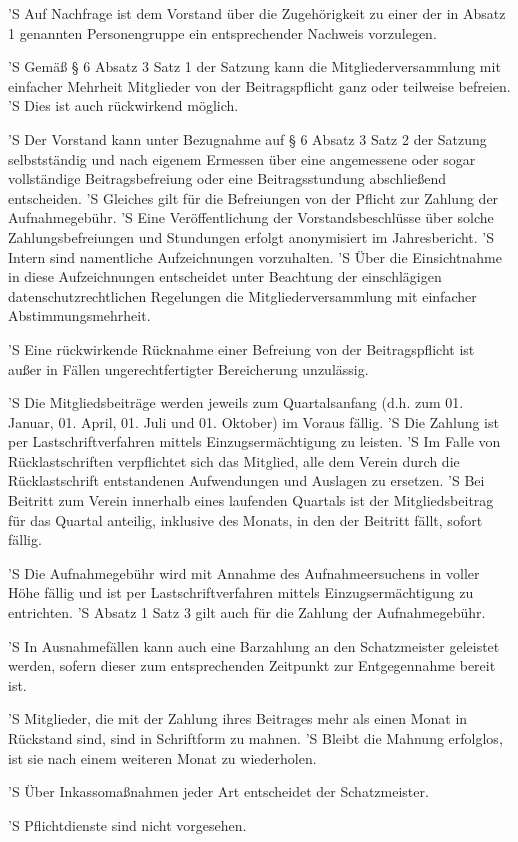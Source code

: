 \documentclass[a4paper,10pt]{scrreprt}
\begin{document}
\begin{contract}
'S Auf Nachfrage ist dem Vorstand über die Zugehörigkeit zu einer der in Absatz
1 genannten Personengruppe ein entsprechender Nachweis vorzulegen.

'S Gemäß § 6 Absatz 3 Satz 1 der Satzung kann die Mitgliederversammlung mit
einfacher Mehrheit Mitglieder von der Beitragspflicht ganz oder teilweise
befreien.
'S Dies ist auch rückwirkend möglich.

'S Der Vorstand kann unter Bezugnahme auf § 6 Absatz 3 Satz 2 der Satzung
selbstständig und nach eigenem Ermessen über eine angemessene oder sogar
vollständige Beitragsbefreiung oder eine Beitragsstundung abschließend
entscheiden.
'S Gleiches gilt für die Befreiungen von der Pflicht zur Zahlung der
Aufnahmegebühr.
'S Eine Veröffentlichung der Vorstandsbeschlüsse über solche
Zahlungsbefreiungen und Stundungen erfolgt anonymisiert im Jahresbericht.
'S Intern sind namentliche Aufzeichnungen vorzuhalten.
'S Über die Einsichtnahme in diese Aufzeichnungen entscheidet unter Beachtung
der einschlägigen datenschutzrechtlichen Regelungen die Mitgliederversammlung
mit einfacher Abstimmungsmehrheit.

'S Eine rückwirkende Rücknahme einer Befreiung von der Beitragspflicht ist
außer in Fällen ungerechtfertigter Bereicherung unzulässig.


'S Die Mitgliedsbeiträge werden jeweils zum Quartalsanfang (d.h. zum 01.
Januar, 01. April, 01. Juli und 01. Oktober) im Voraus fällig.
'S Die Zahlung ist per Lastschriftverfahren mittels Einzugsermächtigung zu
leisten.
'S Im Falle von Rücklastschriften verpflichtet sich das Mitglied, alle dem
Verein durch die Rücklastschrift entstandenen Aufwendungen und Auslagen zu
ersetzen.
'S Bei Beitritt zum Verein innerhalb eines laufenden Quartals ist der
Mitgliedsbeitrag für das Quartal anteilig, inklusive des Monats, in den der
Beitritt fällt, sofort fällig.

'S Die Aufnahmegebühr wird mit Annahme des Aufnahmeersuchens in voller Höhe
fällig und ist per Lastschriftverfahren mittels Einzugsermächtigung zu
entrichten.
'S Absatz 1 Satz 3 gilt auch für die Zahlung der Aufnahmegebühr.

'S In Ausnahmefällen kann auch eine Barzahlung an den Schatzmeister geleistet
werden, sofern dieser zum entsprechenden Zeitpunkt zur Entgegennahme bereit
ist.


'S Mitglieder, die mit der Zahlung ihres Beitrages mehr als einen Monat in
Rückstand sind, sind in Schriftform zu mahnen.
'S Bleibt die Mahnung erfolglos, ist sie nach einem weiteren Monat zu
wiederholen.

'S Über Inkassomaßnahmen jeder Art entscheidet der Schatzmeister.


'S Pflichtdienste sind nicht vorgesehen.

\end{contract}
\end{document}
